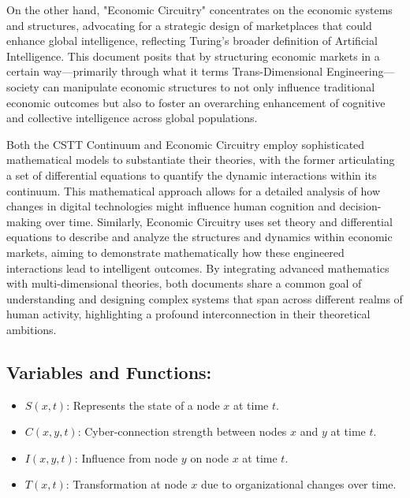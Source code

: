 \documentclass{article}
\begin{document}
On the other hand, "Economic Circuitry" concentrates on the economic systems and structures, advocating for a strategic design of marketplaces that could enhance global intelligence, reflecting Turing's broader definition of Artificial Intelligence. This document posits that by structuring economic markets in a certain way—primarily through what it terms Trans-Dimensional Engineering—society can manipulate economic structures to not only influence traditional economic outcomes but also to foster an overarching enhancement of cognitive and collective intelligence across global populations.

Both the CSTT Continuum and Economic Circuitry employ sophisticated mathematical models to substantiate their theories, with the former articulating a set of differential equations to quantify the dynamic interactions within its continuum. This mathematical approach allows for a detailed analysis of how changes in digital technologies might influence human cognition and decision-making over time. Similarly, Economic Circuitry uses set theory and differential equations to describe and analyze the structures and dynamics within economic markets, aiming to demonstrate mathematically how these engineered interactions lead to intelligent outcomes. By integrating advanced mathematics with multi-dimensional theories, both documents share a common goal of understanding and designing complex systems that span across different realms of human activity, highlighting a profound interconnection in their theoretical ambitions.
\subsection*{Variables and Functions:}
\begin{itemize}
  \item $S(x, t)$: Represents the state of a node $x$ at time $t$.
  \item $C(x, y, t)$: Cyber-connection strength between nodes $x$ and $y$ at time $t$.
  \item $I(x, y, t)$: Influence from node $y$ on node $x$ at time $t$.
  \item $T(x, t)$: Transformation at node $x$ due to organizational changes over time.
\end{itemize}
\end{document}
